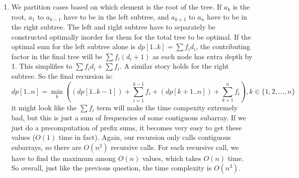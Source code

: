 \documentclass[12pt]{report}
\begin{document}
\begin{enumerate}[label=\textbf{\arabic*.}]
  \item We partition cases based on which element is the root of the tree. If $a_k$ is the root, $a_1$ to $a_{k-1}$ have to be in the left subtree, and $a_{k+1}$ to $a_n$ have to be in the right subtree.
  The left and right subtree have to separately be constructed optimally inorder for them for the total tree to be optimal. If the optimal sum for the left subtree alone is $dp[1..k] = \sum f_i d_i$, the 
  contributing factor in the final tree will be $\sum f_i (d_i + 1)$ as each node has extra depth by 1. This simplifies to $\sum f_i d_i + \sum f_i$. A similar story holds for the right subtree. So the
  final recursion is:
  \[dp[1 .. n] = \min_k \left((dp[1 .. k-1]) + \sum_{i=1}^{k-1} f_i + (dp[k+1 .. n]) + \sum_{k+1}^{n} f_i \right), k \in \{1, 2, \dots, n\} \] 
  it might look like the $\sum f_i$ term will make the time compexity extremely bad, but this is just a sum of frequencies of some contiguous subarray. If we just do a precomputation of prefix sums, it
  becomes very easy to get these values ($O(1)$ time in fact). Again, our recursion only calls contiguous subarrays, so there are $O(n^2)$ recursive calls. For each recursive call, we have to find the maximum
  among $O(n)$ values, which takes $O(n)$ time. So overall, just like the previous question, the time complexity is $O(n^3)$.
  \end{enumerate}
\end{document}
